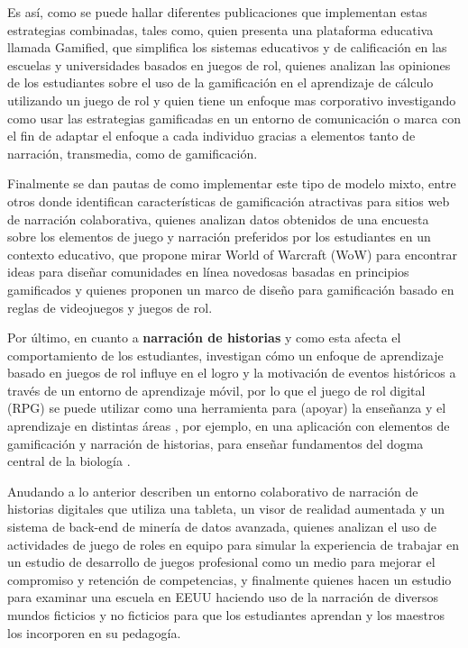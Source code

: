 Es así, como se puede hallar diferentes publicaciones que implementan estas estrategias combinadas, tales 
como,  quien presenta una plataforma educativa llamada Gamified, que simplifica los 
sistemas educativos y de calificación en las escuelas y universidades basados en juegos de rol, 
 quienes analizan las opiniones de los estudiantes sobre el uso de la gamificación en el
aprendizaje de cálculo utilizando un juego de rol y  quien tiene un enfoque mas 
corporativo investigando como usar las estrategias gamificadas en un entorno de comunicación o marca con el 
fin de adaptar el enfoque a cada individuo gracias a elementos tanto de narración, transmedia, como de 
gamificación.

Finalmente se dan pautas de como implementar este tipo de modelo mixto, entre otros 
 donde identifican características de gamificación atractivas para sitios
web de narración colaborativa,  quienes analizan datos obtenidos de una encuesta sobre los 
elementos de juego y narración preferidos por los estudiantes en un contexto educativo, 
\cite{13034670820180801} que propone mirar World of Warcraft (WoW) para encontrar ideas para diseñar 
comunidades en línea novedosas basadas en principios gamificados y \cite{Ntokos2019} quienes proponen un marco 
de diseño para gamificación basado en reglas de videojuegos y juegos de rol.

Por último, en cuanto a \textbf{narración de historias} y como esta afecta el comportamiento de los 
estudiantes,  investigan cómo un enfoque de aprendizaje basado en juegos de rol influye 
en el logro y la motivación de eventos históricos a través de un entorno de aprendizaje móvil, por lo que el 
juego de rol digital (RPG) se puede utilizar como una herramienta para (apoyar) la enseñanza y el aprendizaje 
en distintas áreas \cite{Nunes2021663}, por ejemplo, en una aplicación con elementos de gamificación y 
narración de historias, para enseñar fundamentos del dogma central de la biología \cite{Ibarra-Herrera2019}.

Anudando a lo anterior  describen un entorno colaborativo de narración de historias 
digitales que utiliza una tableta, un visor de realidad aumentada y un sistema de back-end de minería de datos 
avanzada,  quienes analizan el uso de actividades de juego de roles en equipo para simular la 
experiencia de trabajar en un estudio de desarrollo de juegos profesional como un medio para mejorar el 
compromiso y retención de competencias, y finalmente  quienes hacen un estudio para 
examinar una escuela en EEUU haciendo uso de la narración de diversos mundos ficticios y no ficticios para que 
los estudiantes aprendan y los maestros los incorporen en su pedagogía.

